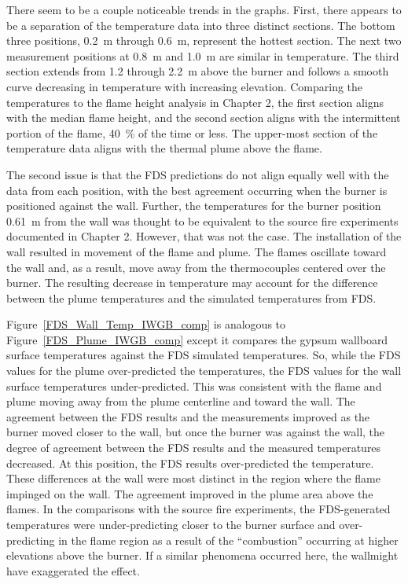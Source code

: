 \documentclass[twoside]{uocthesis}
\begin{document}
{ There seem to be a couple noticeable trends in the graphs.  First, there appears to be a separation of the temperature data into three distinct sections.  The bottom three positions, 0.2~m through 0.6~m, represent the hottest section.  The next two measurement positions at 0.8~m and 1.0~m are similar in temperature.  The third section extends from 1.2 through 2.2~m above the burner and follows a smooth curve decreasing in temperature with increasing elevation.  Comparing the temperatures to the flame height analysis in Chapter 2, the first section aligns with the median flame height, and the second section aligns with the intermittent portion of the flame, 40~$\%$ of the time or less.  The upper-most section of the temperature data aligns with the thermal plume above the flame.  

 The second issue is that the FDS predictions do not align equally well with the data from each position, with the best agreement occurring when the burner is positioned against the wall.  Further, the temperatures for the burner position 0.61~m from the wall was thought to be equivalent to the source fire experiments documented in Chapter 2. However, that was not the case.  The installation of the wall resulted in movement of the flame and plume.  The flames oscillate toward the wall and, as a result, move away from the thermocouples centered over the burner. The resulting decrease in temperature may account for the difference between the plume temperatures and the simulated temperatures from FDS.                     

Figure~\ref{FDS_Wall_Temp_IWGB_comp} is analogous to Figure~\ref{FDS_Plume_IWGB_comp} except it compares the gypsum wallboard surface temperatures against the FDS simulated temperatures.  So, while the FDS values for the plume over-predicted the temperatures, the FDS values for the wall surface temperatures under-predicted.  This was consistent with the flame and plume moving away from the plume centerline and toward the wall.  The agreement between the FDS results and the measurements improved as the burner moved closer to the wall, but once the burner was against the wall, the degree of agreement between the FDS results and the measured temperatures decreased.  At this position, the FDS results over-predicted the temperature. These differences at the wall were most distinct in the region where the flame impinged on the wall.  The agreement improved in the plume area above the flames.  In the comparisons with the source fire experiments, the FDS-generated temperatures were under-predicting closer to the burner surface and over-predicting in the flame region as a result of the ``combustion'' occurring at higher elevations above the burner.  If a similar phenomena occurred here, the wallmight have exaggerated the effect.      

}
\end{document}
